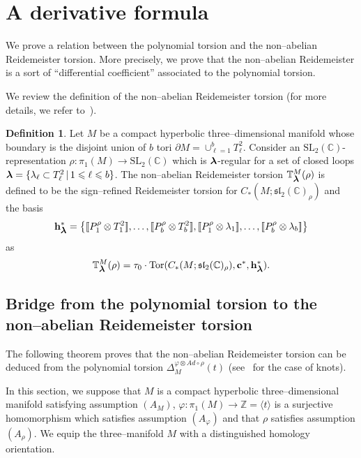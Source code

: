 \documentclass[a4paper]{amsart}
\theoremstyle{plain}
\theoremstyle{definition}
\newtheorem{definition}{Definition}
\theoremstyle{remark}
\newcommand{\myleq}{\leqslant}
\newcommand{\ZZ}{{\mathbb Z}}
\newcommand{\CC}{{\mathbb C}}
\newcommand{\SL}{{\mathrm{SL}_2(\CC)}}
\newcommand{\bm}[1]{\mbox{\boldmath $#1$}}
\newcommand{\smallbm}[1]{\mbox{\small \boldmath $#1$}}
\newcommand{\sllrho}{\mathfrak{sl}_2(\CC)_\rho}
\newcommand{\PolyTors}[2]{\Delta_{#1}^{#2}}
\newcommand{\RTors}[2]{\mathbb{T}^{#1}_{#2}}
\newcommand{\Tor}[3]{\mathrm{Tor} ({#1}, {#2}, {#3})}
\newcommand{\otAd}[2]{#1 \otimes Ad \circ #2}
\newcommand{\bbrack}[1]{\lbrack \! \lbrack #1 \rbrack \! \rbrack}
\newcommand{\cbasis}[2][c]{\mathbf{#1}^{#2}}
\newcommand{\hbasis}[2][h]{\mathbf{#1}^{#2}}
\begin{document}
\section{A derivative formula}
\label{section:derform}

We prove a relation between the polynomial torsion and 
the non--abelian Reidemeister torsion. 
More precisely, we prove that
the non--abelian Reidemeister is a sort of ``differential coefficient''
associated to the polynomial torsion.

We review the definition of the non--abelian Reidemeister torsion (for
more details, we refer to~\cite[Chap.~3]{Porti:1997}).
\begin{definition}\label{def:torsion}
  Let $M$ be a compact hyperbolic three--dimensional manifold whose
  boundary is the disjoint union of $b$ tori $\partial M = \cup_{\ell = 1}^b T^2_\ell$. Consider an
  $\SL$-representation $\rho \colon \pi_1(M) \to \SL$ which is
  $\bm{\lambda}$-regular for a set of closed loops $\bm{\lambda} =
  \{\lambda_\ell \subset T^2_\ell\,|\, 1 \myleq \ell \myleq b \}$.
  The non--abelian Reidemeister torsion
  $\RTors{M}{\smallbm{\lambda}}(\rho)$ is defined to be the sign--refined
  Reidemeister torsion for $C_*(M; \sllrho)$ and the basis
  $$\hbasis{*}_{\smallbm{\lambda}} = \big\{ 
    \bbrack{P^\rho_1 \otimes T^2_1},
      \ldots, 
    \bbrack{P^\rho_b \otimes T^2_b}, 
    \bbrack{P^\rho_1 \otimes \lambda_1},
      \ldots, 
    \bbrack{P^\rho_b \otimes \lambda_b}
                              \big\}$$ as
  \[
  \RTors{M}{\smallbm{\lambda}}(\rho) = \tau_0 \cdot \Tor{C_*(M;
    \sllrho)}{\cbasis{*}}{\hbasis{*}_{\smallbm{\lambda}}}.
  \]
\end{definition} 

\subsection{Bridge from the polynomial torsion to the non--abelian
  Reidemeister torsion}

The following theorem proves that the non--abelian Reidemeister
torsion can be deduced from the polynomial torsion
$\PolyTors{M}{\otAd{\varphi}{\rho}}(t)$ (see~\cite{YY:Fourier} for the
case of knots).

In this section, we suppose that $M$ is a compact hyperbolic three--dimensional manifold satisfying assumption 
$(A_M)$, $\varphi\colon \pi_1(M) \to \ZZ = \langle t \rangle$ is a
surjective homomorphism which satisfies assumption $(A_\varphi)$
and that $\rho$ satisfies assumption $(A_\rho)$.  We equip the three--manifold
$M$ with a distinguished homology orientation.
\end{document}
